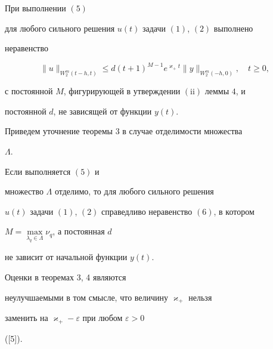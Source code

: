 \begin{thm}


При выполнении $(5)$


для любого сильного решения $u(t)$ задачи $(1)$, $(2)$ выполнено


неравенство


\begin{equation}


\label{aaa}


\|u\|_{W_2^m(t-h,t)}\le d(t+1)^{M-1}e^{\varkappa_+ t}\|y\|_{W_2^m(-h,0)},\quad


t\ge 0,


\end{equation}


с постоянной $M$, фигурирующей в утверждении $(\mathrm{ii})$ леммы $4$, и


постоянной $d$, не зависящей от функции $y(t)$.


\end{thm}





Приведем уточнение теоремы 3 в случае отделимости множества


$\Lambda$.





\begin{thm}


Если выполняется $(5)$ и 


множество $\Lambda$ отделимо, то для любого сильного решения


$u(t)$ задачи $(1)$, $(2)$ справедливо неравенство $(6)$, в котором


$M=\max\limits_{\lambda_q\in\Lambda}\nu_q$, а постоянная $d$


не зависит от начальной функции $y(t)$.


\end{thm}





\begin{note}


Оценки в теоремах 3, 4 являются


неулучшаемыми в том смысле, что величину $\varkappa_+$ нельзя


заменить на $\varkappa_+-\varepsilon$ при любом $\varepsilon>0$


([5]).


\end{note}









